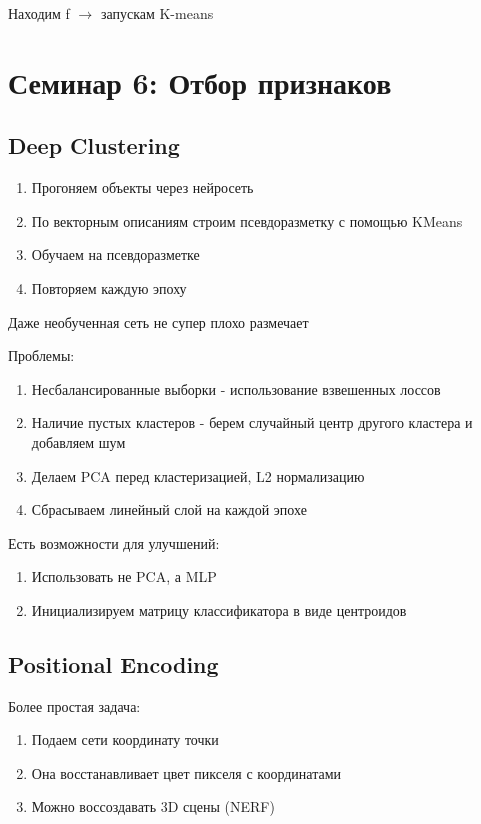 \documentclass[a4paper, 12pt]{article}
\begin{document}
Находим f $\rightarrow$ запускам K-means

\section{Семинар 6: Отбор признаков}

\subsection{Deep Clustering}

\begin{enumerate}
    \item Прогоняем объекты через нейросеть
    \item По векторным описаниям строим псевдоразметку
    с помощью KMeans
    \item Обучаем на псевдоразметке
    \item Повторяем каждую эпоху
\end{enumerate}

Даже необученная сеть не супер плохо размечает

Проблемы:

\begin{enumerate}
    \item Несбалансированные выборки - использование 
    взвешенных лоссов
    \item Наличие пустых кластеров - берем случайный центр 
    другого кластера и добавляем шум
    \item Делаем PCA перед кластеризацией, L2 нормализацию
    \item Сбрасываем линейный слой на каждой эпохе
\end{enumerate}

Есть возможности для улучшений:

\begin{enumerate}
    \item Использовать не PCA, а MLP
    \item Инициализируем матрицу классификатора в виде центроидов
\end{enumerate}

\subsection{Positional Encoding}

Более простая задача:

\begin{enumerate}
    \item Подаем сети координату точки
    \item Она восстанавливает цвет пикселя с координатами
    \item Можно воссоздавать 3D сцены (NERF)
\end{enumerate}
\end{document}
